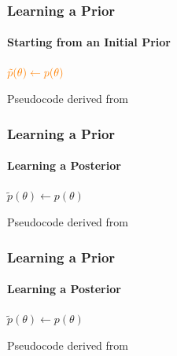 \documentclass[9pt]{beamer}
\begin{document}
\begin{frame}
\frametitle{Learning a Prior}
\framesubtitle{Starting from an Initial Prior}
\begin{algorithm}[H]
	$\color{orange}\tilde{p}(\theta) \leftarrow p(\theta)$\\
\end{algorithm}
\vspace{35pt}
\tiny Pseudocode derived from \cite{papamakarios2016fast}
\end{frame} 
\begin{frame}
\frametitle{Learning a Prior}
\framesubtitle{Learning a Posterior}
\begin{algorithm}[H]
	$\tilde{p}(\theta) \leftarrow p(\theta)$\\
\end{algorithm}
\vspace{35pt}
\tiny Pseudocode derived from \cite{papamakarios2016fast}
\end{frame} 
\begin{frame}
\frametitle{Learning a Prior}
\framesubtitle{Learning a Posterior}
\begin{algorithm}[H]
	$\tilde{p}(\theta) \leftarrow p(\theta)$\\
\end{algorithm}
\vspace{35pt}
\tiny Pseudocode derived from \cite{papamakarios2016fast}
\end{frame} 
\end{document}
